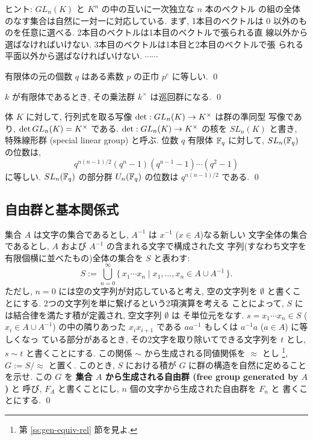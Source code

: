 \documentclass[12pt,twoside]{jarticle}
\def\F{{\Bbb F}}
\def\det{\mathop{\text{\rm det}}\nolimits}          %
\begin{document}
\noindent ヒント: $GL_n(K)$ と $K^n$ の中の互いに一次独立な $n$ 本のベクトル
の組の全体のなす集合は自然に一対一に対応している. まず, 1本目のベクトルは
$0$ 以外のものを任意に選べる. 2本目のベクトルは1本目のベクトルで張られる直
線以外から選ばなければいけない. 3本目のベクトルは1本目と2本目のベクトルで張
られる平面以外から選ばなければいけない. $\cdots\cdots$

\begin{question}
  有限体の元の個数 $q$ はある素数 $p$ の正巾 $p^e$ に等しい. \qed
\end{question}

\begin{question}
  $k$ が有限体であるとき, その乗法群 $k^\times$ は巡回群になる. \qed
\end{question}

\begin{question}[特殊線形群]
  体 $K$ に対して, 行列式を取る写像 $\det:GL_n(K)\to K^\times$ は群の準同型
  写像であり, $\det GL_n(K) = K^\times$ である. $\det:GL_n(K)\to K^\times$ 
  の核を $SL_n(K)$ と書き, 特殊線形群 (special linear group) と呼ぶ.
  位数 $q$ 有限体 $\F_q$ に対して, $SL_n(\F_q)$ の位数は,
  \begin{equation*}
    q^{n(n-1)/2} (q^n-1)(q^{n-1}-1)\cdots(q^2-1)
  \end{equation*}
  に等しい. $SL_n(\F_q)$ の部分群 $U_n(\F_q)$ の位数は $q^{n(n-1)/2}$ である.
  \qed
\end{question}


\subsection{自由群と基本関係式}
\label{ss:generators-relations}

\begin{question}[自由群の構成]
  集合 $A$ は文字の集合であるとし, $A^{-1}$ は $x^{-1}$ ($x\in A$)なる新しい
  文字全体の集合であるとし, $A$ および $A^{-1}$ の含まれる文字で構成された文
  字列(すなわち文字を有限個横に並べたもの)全体の集合を $S$ と表わす:
  \begin{equation*}
    S :=
    \bigcup_{n=0}^\infty
    \{\, x_1\cdots x_n \mid x_1,\dots,x_n\in A\cup A^{-1}\,\}.
  \end{equation*}
  ただし, $n=0$ には空の文字列が対応していると考え, 空の文字列を %
  $\emptyset$ と書くことにする. 2つの文字列を単に繋げるという2項演算を考える
  ことによって, $S$ には結合律を満たす積が定義され, 空文字列 $\emptyset$ は
  そ単位元をなす. 
  $s = x_1\cdots x_n\in S$ ($x_i\in A\cup A^{-1}$) の中の隣りあった %
  $x_i x_{i+1}$ である $aa^{-1}$ もしくは $a^{-1}a$ ($a\in A$) に等しくなっ
  ている部分があるとき, その2文字を取り除いてできる文字列を $t$ とし, 
  $s\sim t$ と書くことにする. 
  この関係 $\sim$ から生成される同値関係を $\approx$ とし%
  \footnote{第 \ref{ss:gen-equiv-rel} 節を見よ.}, 
  $G := S/{\approx}$ と置く. 
  このとき, $S$ における積が $G$ に群の構造を自然に定めることを示せ.
  この $G$ を
  {\bf 集合 $A$ から生成される自由群 (free group generated by $A$)} と
  呼び, $F_A$ と書くことにし,  $n$ 個の文字から生成された自由群を $F_n$ と
  書くことにする.
  \qed
\end{question}
\end{document}
